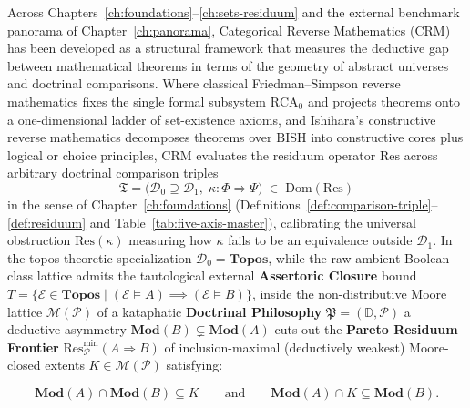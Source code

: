 \documentclass[10pt,twoside,openright]{book}
\theoremstyle{crmplain}
\theoremstyle{crmdef}
\theoremstyle{crmremark}
\begin{document}
Across Chapters~\ref{ch:foundations}--\ref{ch:sets-residuum} and the external benchmark panorama of Chapter~\ref{ch:panorama}, Categorical Reverse Mathematics ($\mathrm{CRM}$) has been developed as a structural framework that measures the deductive gap between mathematical theorems in terms of the geometry of abstract universes and doctrinal comparisons. Where classical Friedman--Simpson reverse mathematics fixes the single formal subsystem $\mathrm{RCA}_0$ and projects theorems onto a one-dimensional ladder of set-existence axioms, and Ishihara's constructive reverse mathematics decomposes theorems over $\mathrm{BISH}$ into constructive cores plus logical or choice principles, $\mathrm{CRM}$ evaluates the residuum operator $\mathrm{Res}$ across arbitrary doctrinal comparison triples
\[
  \mathfrak{T} = \bigl(\mathcal{D}_0 \supseteq \mathcal{D}_1,\; \kappa : \Phi \Longrightarrow \Psi\bigr) \;\in\; \mathrm{Dom}(\mathrm{Res})
\]
in the sense of Chapter~\ref{ch:foundations} (Definitions~\ref{def:comparison-triple}--\ref{def:residuum} and Table~\ref{tab:five-axis-master}), calibrating the universal obstruction $\mathrm{Res}(\kappa)$ measuring how $\kappa$ fails to be an equivalence outside $\mathcal{D}_1$. In the topos-theoretic specialization $\mathcal{D}_0 = \mathbf{Topos}$, while the raw ambient Boolean class lattice admits the tautological external \textbf{Assertoric Closure} bound $T = \{\mathcal{E} \in \mathbf{Topos} \mid (\mathcal{E} \models A) \implies (\mathcal{E} \models B)\}$, inside the non-distributive Moore lattice $\mathcal{M}(\mathcal{P})$ of a kataphatic \textbf{Doctrinal Philosophy} $\mathfrak{P} = (\mathbb{D}, \mathcal{P})$ a deductive asymmetry $\mathbf{Mod}(B) \subsetneq \mathbf{Mod}(A)$ cuts out the \textbf{Pareto Residuum Frontier} $\mathrm{Res}_{\mathcal{P}}^{\min}(A \Rightarrow B)$ of inclusion-maximal (deductively weakest) Moore-closed extents $K \in \mathcal{M}(\mathcal{P})$ satisfying:

\[
  \mathbf{Mod}(A) \cap \mathbf{Mod}(B) \subseteq K \qquad\text{and}\qquad \mathbf{Mod}(A) \cap K \subseteq \mathbf{Mod}(B).
\]
\end{document}
